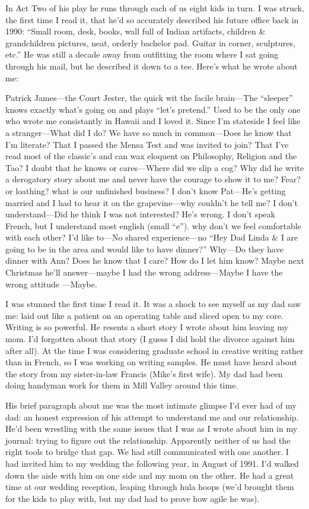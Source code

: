 \documentclass[12pt]{book}
\begin{document}
In Act Two of his play he runs through each of us eight kids in turn. I was struck, the first time I read it, that he'd so accurately described his future office back in 1990: ``Small room, desk, books, wall full of Indian artifacts, children \& grandchildren pictures, neat, orderly bachelor pad. Guitar in corner, sculptures, etc.'' He was still a decade away from outfitting the room where I sat going through his mail, but he described it down to a tee. Here's what he wrote about me:

Patrick James---the Court Jester, the quick wit the facile brain---The ``sleeper'' knows exactly what's going on and plays ``let's pretend.'' Used to be the only one who wrote me consistantly in Hawaii and I loved it. Since I'm stateside I feel like a stranger---What did I do? We have so much in common---Does he know that I'm literate? That I passed the Mensa Test and was invited to join? That I've read most of the classic's and can wax eloquent on Philosophy, Religion and the Tao? I doubt that he knows or cares---Where did we slip a cog? Why did he write a derogatory story about me and never have the courage to show it to me? Fear? or loathing? what is our unfinished business? I don't know Pat---He's getting married and I had to hear it on the grapevine---why couldn't he tell me? I don't understand---Did he think I was not interested? He's wrong. I don't speak French, but I understand most english (small ``e''). why don't we feel comfortable with each other? I'd like to---No shared experience---no ``Hey Dad Linda \& I are going to be in the area and would like to have dinner?'' Why---Do they have dinner with Ann? Does he know that I care? How do I let him know? Maybe next Christmas he'll answer---maybe I had the wrong address---Maybe I have the wrong attitude ---Maybe.

I was stunned the first time I read it. It was a shock to see myself as my dad saw me: laid out like a patient on an operating table and sliced open to my core. Writing is so powerful. He resents a short story I wrote about him leaving my mom. I'd forgotten about that story (I guess I did hold the divorce against him after all). At the time I was considering graduate school in creative writing rather than in French, so I was working on writing samples. He must have heard about the story from my sister-in-law Francis (Mike's first wife). My dad had been doing handyman work for them in Mill Valley around this time.

His brief paragraph about me was the most intimate glimpse I'd ever had of my dad: an honest expression of his attempt to understand me and our relationship. He'd been wrestling with the same issues that I was as I wrote about him in my journal: trying to figure out the relationship. Apparently neither of us had the right tools to bridge that gap. We had still communicated with one another. I had invited him to my wedding the following year, in August of 1991. I'd walked down the aisle with him on one side and my mom on the other. He had a great time at our wedding reception, leaping through hula hoops (we'd brought them for the kids to play with, but my dad had to prove how agile he was).
\end{document}
